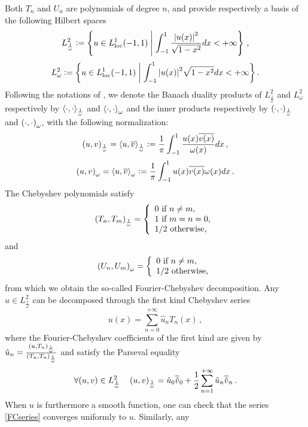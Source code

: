 \documentclass[a4paper]{article}
\begin{document}
Both $T_n$ and $U_n$ are polynomials of degree $n$, and provide respectively a basis of the following Hilbert spaces
$$L^2_{\frac{1}{\omega}} \mathrel{\mathop:}= \left\{u \in L^1_\textup{loc}(-1,1)\mathrel{}\middle|\mathrel{}\int_{-1}^{1} \dfrac{\left\lvert u(x) \right\rvert^2}{\sqrt{1 - x^2} }dx< + \infty\right\}\,,$$ 
$$L^2_{\omega} \mathrel{\mathop:}= \left\{u \in L^1_\textup{loc}(-1,1)\mathrel{}\middle|\mathrel{}\int_{-1}^{1} {\left\lvert u(x) \right\rvert^2}{\sqrt{1 - x^2} }dx< + \infty\right\}.$$
Following the notations of \cite{mclean2000strongly}, we denote the Banach duality products of $L^2_\frac{1}{\omega}$ and $L^2_\omega$ respectively by $\left\langle \cdot,\cdot\right\rangle_\frac{1}{\omega}$ and $\left\langle \cdot,\cdot\right\rangle_\omega$ and the inner products respectively by $\left( \cdot,\cdot\right)_\frac{1}{\omega}$ and $\left( \cdot,\cdot\right)_\omega$, with the following normalization:
\[\left( u,v\right)_{\frac{1}{\omega}} = \left\langle u,\overline v\right\rangle_\frac{1}{\omega} \mathrel{\mathop:}= \frac{1}{\pi}\int_{-1}^{1} \frac{u(x) \overline{v(x)}}{\omega(x)}dx\,,\]
\[\left( u,v\right)_{\omega} = \left\langle u,\overline v\right\rangle_{\omega} \mathrel{\mathop:}= \frac{1}{\pi}\int_{-1}^{1} {u(x) \overline{v(x)}}{\omega(x)}dx\,.\]
The Chebyshev polynomials satisfy
\begin{equation}
	\left( T_n,T_m\right)_\frac{1}{\omega} = \left\{
	\begin{array}{l}
	0 \mbox{ if } n\ne m,\\
	1 \mbox{ if } m=n=0,\\
	1/2 \mbox{ otherwise,}
	\end{array} 
	\right.
\end{equation}
and
\begin{equation}
	\left( U_n,U_m\right)_{\omega} = \left\{
	\begin{array}{l}
	0 \mbox{ if } n\ne m,\\
	1/2 \mbox{ otherwise,}
	\end{array} 
	\right.
\end{equation}
from which we obtain the so-called Fourier-Chebyshev decomposition. Any
$u\in L^2_{\frac{1}{\omega}}$ can be decomposed through the first kind Chebyshev series 
\begin{equation}
	u(x) = \sum_{n=0}^{+\infty} \hat{u}_n T_n(x)\,,
	\label{FCseries}
\end{equation}
where the Fourier-Chebyshev coefficients of the first kind are given by $\hat{u}_n = \frac{\left( u,T_n\right)_{\frac{1}{\omega}}}{\left( T_n,T_n\right)_{\frac{1}{\omega}}}$ and satisfy the Parseval equality
\[\forall (u,v) \in L^2_\frac{1}{\omega} \quad  \left( u,v\right)_\frac{1}{\omega} = \hat{u}_0 \overline{\hat{v}}_0 + \frac{1}{2}\sum_{n=1}^{+\infty}\hat{u}_n \overline{\hat{v}}_n \,.\]
When $u$ is furthermore a smooth function, one can check that the series \eqref{FCseries} converges uniformly to $u$. Similarly, any 
\end{document}
